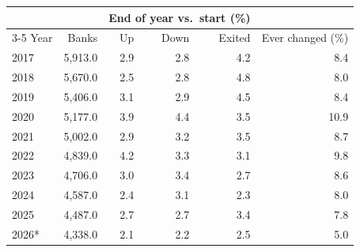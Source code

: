 \begin{tabular}{@{}lrrrrr@{}}
\toprule
 & & \multicolumn{3}{c}{End of year vs.\ start (\%)} & \\
\cmidrule(lr){3-5}
Year & Banks & Up & Down & Exited & Ever changed (\%) \\
\midrule
2017 & 5{,}913.0 & 2.9 & 2.8 & 4.2 & 8.4 \\
2018 & 5{,}670.0 & 2.5 & 2.8 & 4.8 & 8.0 \\
2019 & 5{,}406.0 & 3.1 & 2.9 & 4.5 & 8.4 \\
2020 & 5{,}177.0 & 3.9 & 4.4 & 3.5 & 10.9 \\
2021 & 5{,}002.0 & 2.9 & 3.2 & 3.5 & 8.7 \\
2022 & 4{,}839.0 & 4.2 & 3.3 & 3.1 & 9.8 \\
2023 & 4{,}706.0 & 3.0 & 3.4 & 2.7 & 8.6 \\
2024 & 4{,}587.0 & 2.4 & 3.1 & 2.3 & 8.0 \\
2025 & 4{,}487.0 & 2.7 & 2.7 & 3.4 & 7.8 \\
2026* & 4{,}338.0 & 2.1 & 2.2 & 2.5 & 5.0 \\
\bottomrule
\end{tabular}
